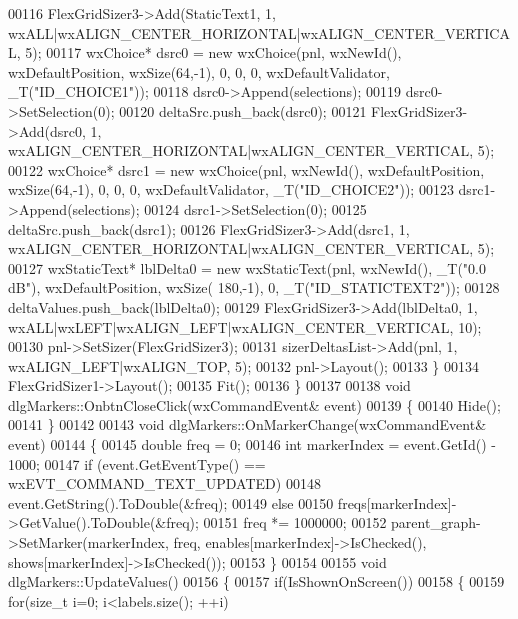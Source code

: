 \begin{DoxyCode}
{{{{00116         FlexGridSizer3->Add(StaticText1, 1, wxALL|wxALIGN\_CENTER\_HORIZONTAL|wxALIGN\_CENTER\_VERTICAL, 5);
00117         wxChoice* dsrc0 = \textcolor{keyword}{new} wxChoice(pnl, wxNewId(), wxDefaultPosition, wxSize(64,-1), 0, 0, 0, 
      wxDefaultValidator, \_T(\textcolor{stringliteral}{"ID\_CHOICE1"}));
00118         dsrc0->Append(selections);
00119         dsrc0->SetSelection(0);
00120         deltaSrc.push\_back(dsrc0);
00121         FlexGridSizer3->Add(dsrc0, 1, wxALIGN\_CENTER\_HORIZONTAL|wxALIGN\_CENTER\_VERTICAL, 5);
00122         wxChoice* dsrc1 = \textcolor{keyword}{new} wxChoice(pnl, wxNewId(), wxDefaultPosition, wxSize(64,-1), 0, 0, 0, 
      wxDefaultValidator, \_T(\textcolor{stringliteral}{"ID\_CHOICE2"}));
00123         dsrc1->Append(selections);
00124         dsrc1->SetSelection(0);
00125         deltaSrc.push\_back(dsrc1);
00126         FlexGridSizer3->Add(dsrc1, 1, wxALIGN\_CENTER\_HORIZONTAL|wxALIGN\_CENTER\_VERTICAL, 5);
00127         wxStaticText* lblDelta0 = \textcolor{keyword}{new} wxStaticText(pnl, wxNewId(), \_T(\textcolor{stringliteral}{"0.0 dB"}), wxDefaultPosition, wxSize(
      180,-1), 0, \_T(\textcolor{stringliteral}{"ID\_STATICTEXT2"}));
00128         deltaValues.push\_back(lblDelta0);
00129         FlexGridSizer3->Add(lblDelta0, 1, wxALL|wxLEFT|wxALIGN\_LEFT|wxALIGN\_CENTER\_VERTICAL, 10);
00130         pnl->SetSizer(FlexGridSizer3);
00131         sizerDeltasList->Add(pnl, 1, wxALIGN\_LEFT|wxALIGN\_TOP, 5);
00132         pnl->Layout();
00133     \}
00134     FlexGridSizer1->Layout();
00135     Fit();
00136 \}
00137 
00138 \textcolor{keywordtype}{void} dlgMarkers::OnbtnCloseClick(wxCommandEvent& event)
00139 \{
00140     Hide();
00141 \}
00142 
00143 \textcolor{keywordtype}{void} dlgMarkers::OnMarkerChange(wxCommandEvent& event)
00144 \{
00145     \textcolor{keywordtype}{double} freq = 0;
00146     \textcolor{keywordtype}{int} markerIndex = \textcolor{keyword}{event}.GetId() - 1000;
00147     \textcolor{keywordflow}{if} (event.GetEventType() == wxEVT\_COMMAND\_TEXT\_UPDATED)
00148         event.GetString().ToDouble(&freq);
00149     \textcolor{keywordflow}{else} 
00150         freqs[markerIndex]->GetValue().ToDouble(&freq);
00151     freq *= 1000000;
00152     parent_graph->SetMarker(markerIndex, freq, enables[markerIndex]->IsChecked(), 
      shows[markerIndex]->IsChecked());
00153 \}
00154 
00155 \textcolor{keywordtype}{void} dlgMarkers::UpdateValues()
00156 \{
00157     \textcolor{keywordflow}{if}(IsShownOnScreen())
00158     \{
00159         \textcolor{keywordflow}{for}(\textcolor{keywordtype}{size\_t} i=0; i<labels.size(); ++i)
}}}}
\end{DoxyCode}
